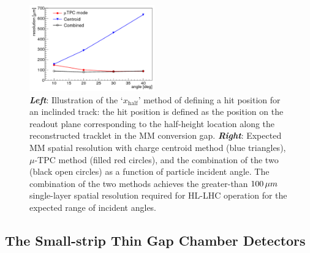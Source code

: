 \begin{figure}[!htb]
    \begin{center}
        \includegraphics[width=0.48\textwidth]{figures/nsw/tpc_vs_centroid_res}
        \caption{
            \textbf{\textit{Left}}: Illustration of the `$x_{\text{half}}$' method of defining a hit position for
                an inclinded track: the hit position is defined as the position on the readout plane
                corresponding to the half-height location along the reconstructed tracklet in the MM conversion gap.
            \textbf{\textit{Right}}: Expected MM spatial resolution with charge centroid method (blue triangles), $\mu$-TPC
                method (filled red circles), and the combination of the two (black open circles) as a function
                of particle incident angle.
                The combination of the two methods achieves the greater-than $100\,\mu m$ single-layer spatial resolution
                required for HL-LHC operation for the expected range of incident angles.
        }
        \label{fig:mm_tpc_hit_loc}
    \end{center}
\end{figure}

\subsection{The Small-strip Thin Gap Chamber Detectors}
\label{sec:nsw_stgc}

